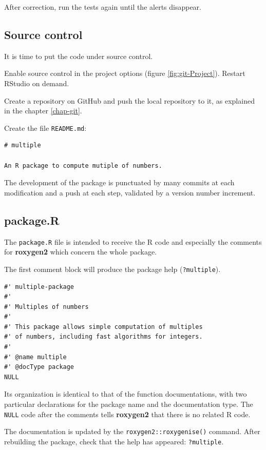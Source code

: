 \documentclass[
  12pt,
  american,
  a4paper,
  extrafontsizes,onecolumn,openright
  ]{memoir}
\begin{document}
After correction, run the tests again until the alerts disappear.

\hypertarget{sec:package-cds}{%
\subsection{Source control}\label{sec:package-cds}}

It is time to put the code under source control.

Enable source control in the project options (figure \ref{fig:git-Project}).
Restart RStudio on demand.

Create a repository on GitHub and push the local repository to it, as explained in the chapter \ref{chap-git}.

Create the file \texttt{README.md}:

\begin{verbatim}
# multiple

An R package to compute mutiple of numbers.
\end{verbatim}

The development of the package is punctuated by many commits at each modification and a push at each step, validated by a version number increment.

\hypertarget{package.r}{%
\subsection{package.R}\label{package.r}}

The \texttt{package.R} file is intended to receive the R code and especially the comments for \textbf{roxygen2} which concern the whole package.

The first comment block will produce the package help (\texttt{?multiple}).

\begin{verbatim}
#' multiple-package
#'
#' Multiples of numbers
#' 
#' This package allows simple computation of multiples 
#' of numbers, including fast algorithms for integers.
#'
#' @name multiple
#' @docType package
NULL
\end{verbatim}

Its organization is identical to that of the function documentations, with two particular declarations for the package name and the documentation type.
The \texttt{NULL} code after the comments tells \textbf{roxygen2} that there is no related R code.

The documentation is updated by the \texttt{roxygen2::roxygenise()} command.
After rebuilding the package, check that the help has appeared: \texttt{?multiple}.
\end{document}
